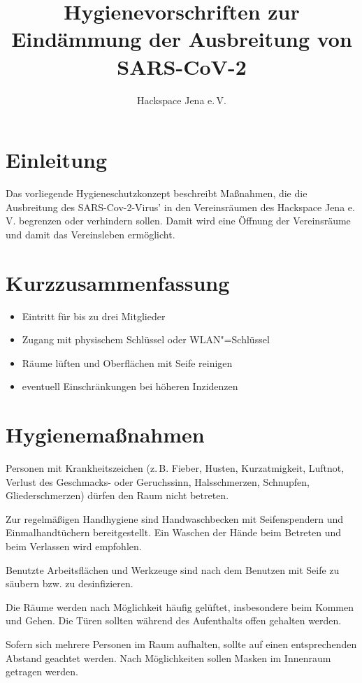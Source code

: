 \documentclass[a4paper,12pt,parskip=half]{scrartcl}
\title{Hygienevorschriften zur Eindämmung der Ausbreitung von SARS-CoV-2}
\author{Hackspace Jena e.\,V.}
\begin{document}
\maketitle

\section*{Einleitung}

Das vorliegende Hygieneschutzkonzept beschreibt Maßnahmen, die die Ausbreitung des SARS-Cov-2-Virus' in den Vereinsräumen des Hackspace Jena e.\,V. begrenzen oder verhindern sollen. Damit wird eine Öffnung der Vereinsräume und damit das Vereinsleben ermöglicht.

\section*{Kurzzusammenfassung}
\begin{itemize}
\item Eintritt für bis zu drei Mitglieder
\item Zugang mit physischem Schlüssel oder WLAN"=Schlüssel
\item Räume lüften und Oberflächen mit Seife reinigen
\item eventuell Einschränkungen bei höheren Inzidenzen
\end{itemize}

\section*{Hygienemaßnahmen}

Personen mit Krankheitszeichen (z.\,B. Fieber, Husten, Kurzatmigkeit, Luftnot, Verlust des
Geschmacks- oder Geruchssinn, Halsschmerzen, Schnupfen, Gliederschmerzen) dürfen den Raum nicht betreten.

Zur regelmäßigen Handhygiene sind Handwaschbecken mit Seifenspendern und
Einmalhandtüchern bereitgestellt. Ein Waschen der Hände beim Betreten und beim Verlassen wird empfohlen.

Benutzte Arbeitsflächen und Werkzeuge sind nach dem Benutzen mit Seife zu säubern bzw. zu desinfizieren.

Die Räume werden nach Möglichkeit häufig gelüftet, insbesondere beim Kommen und
Gehen. Die Türen sollten während des Aufenthalts offen gehalten werden.

Sofern sich mehrere Personen im Raum aufhalten, sollte auf einen entsprechenden
Abstand geachtet werden. Nach Möglichkeiten sollen Masken im Innenraum getragen werden.
\end{document}

